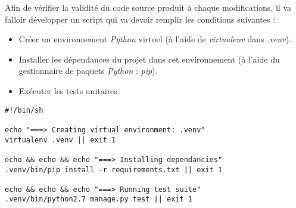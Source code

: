 Afin de vérifier la validité du code source produit à chaque modifications, il va falloir développer
un script qui va devoir remplir les conditions suivantes :

\begin{itemize}
     \item Créer un environnement \textit{Python} virtuel (à l'aide de \textit{virtualenv} dans \textit{.venv}).
     \item Installer les dépendances du projet dans cet environnement (à l'aide du gestionnaire de paquets \textit{Python} : \textit{pip}).
     \item Exécuter les tests unitaires.
\end{itemize}

\begin{verbatim}
#!/bin/sh

echo "===> Creating virtual environment: .venv"
virtualenv .venv || exit 1

echo && echo && echo "===> Installing dependancies"
.venv/bin/pip install -r requirements.txt || exit 1

echo && echo && echo "===> Running test suite"
.venv/bin/python2.7 manage.py test || exit 1
\end{verbatim}

